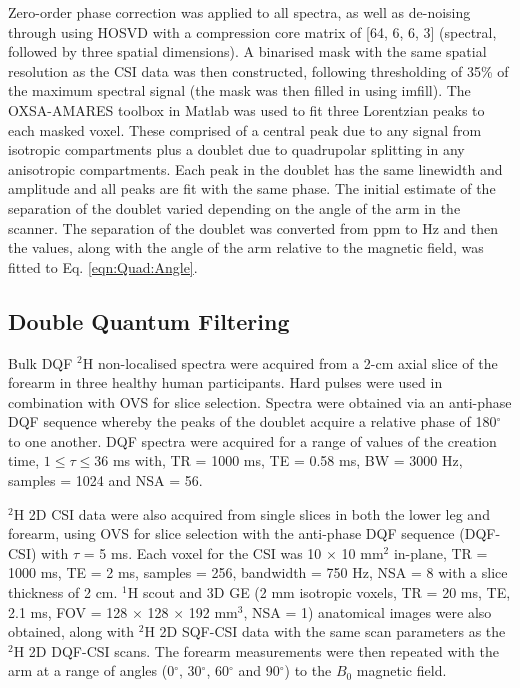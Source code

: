 Zero-order phase correction was applied to all spectra, as well as de-noising through using \ac{HOSVD} \cite{Bader2007EfficientTensors} with a compression core matrix of [64, 6, 6, 3] (spectral, followed by three spatial dimensions). A binarised mask with the same spatial resolution as the \ac{CSI} data was then constructed, following thresholding of 35\% of the maximum spectral signal (the mask was then filled in using imfill). The OXSA-AMARES \cite{Purvis2017OXSA:MATLAB} toolbox in Matlab was used to fit three Lorentzian peaks to each masked voxel. These comprised of a central peak due to any signal from isotropic compartments plus a doublet due to quadrupolar splitting in any anisotropic compartments. Each peak in the doublet has the same linewidth and amplitude and all peaks are fit with the same phase. The initial estimate of the separation of the doublet varied depending on the angle of the arm in the scanner. The separation of the doublet was converted from ppm to Hz and then the values, along with the angle of the arm relative to the magnetic field, was fitted to Eq. \ref{eqn:Quad:Angle}.

\subsection{Double Quantum Filtering}

Bulk \ac{DQF} $^2$H non-localised spectra were acquired from a 2-cm axial slice of the forearm in three healthy human participants. Hard pulses were used in combination with \ac{OVS} for slice selection. Spectra were obtained via an anti-phase \ac{DQF} sequence \cite{Sharf1995DetectionNMR-Spectroscopy} whereby the peaks of the doublet acquire a relative phase of 180$^\circ$ to one another. \ac{DQF} spectra were acquired for a range of values of the creation time, $1\leq\tau\leq36$ ms with, \ac{TR} = 1000 ms, \ac{TE} = 0.58 ms, \ac{BW} = 3000 Hz, samples = 1024 and NSA = 56.

$^2$H 2D \ac{CSI} data were also acquired from single slices in both the lower leg and forearm, using \ac{OVS} for slice selection with the anti-phase \ac{DQF} sequence (\ac{DQF}-\ac{CSI}) with $\tau$ = 5 ms. Each voxel for the \ac{CSI} was 10 $\times$ 10 mm$^2$ in-plane, \ac{TR} = 1000 ms, \ac{TE} = 2 ms, samples = 256, bandwidth = 750 Hz, NSA = 8 with a slice thickness of 2 cm. $^1$H scout and 3D \ac{GE} (2 mm isotropic voxels, \ac{TR} = 20 ms, \ac{TE}, 2.1 ms, \ac{FOV} = 128 $\times$ 128 $\times$ 192 mm$^3$, NSA = 1) anatomical images were also obtained, along with $^2$H 2D \ac{SQF}-\ac{CSI} data with the same scan parameters as the $^2$H 2D \ac{DQF}-\ac{CSI} scans. The forearm measurements were then repeated with the arm at a range of angles (0$^\circ$, 30$^\circ$, 60$^\circ$ and 90$^\circ$) to the $B_0$ magnetic field. 

